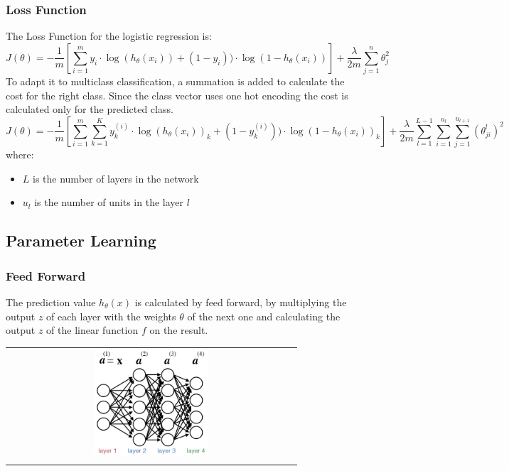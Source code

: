 \subsubsection{Loss Function}
The Loss Function for the logistic regression is:
\begin{equation} \tag{Loss Function}
    J(\theta) = -\frac{1}{m} \left[ \sum_{i=1}^m y_i \cdot \log(h_\theta(x_i)) + (1-y_i)) \cdot \log(1-h_\theta(x_i)) \right] + \frac{\lambda}{2m} \sum_{j=1}^n \theta_j^2
\end{equation}
To adapt it to multiclass classification, a summation is added to calculate the cost for the right class.  Since the class vector uses one hot encoding the cost is calculated only for the predicted class.
\begin{equation} \tag{Softmax}
    J(\theta) = -\frac{1}{m} \left[ \sum_{i=1}^m \sum_{k=1}^K y_k^{(i)} \cdot \log(h_\theta(x_i))_k + (1-y_k^{(i)})) \cdot \log(1-h_\theta(x_i))_k \right] + \frac{\lambda}{2m} \sum_{l=1}^{L-1} \sum_{i=1}^{u_l} \sum_{j=1}^{u_{l+1}} (\theta_{ji}^l)^2
\end{equation}
where:
\begin{itemize}
    \item $L$ is the number of layers in the network
    \item $u_l$ is the number of units in the layer $l$
\end{itemize}

\subsection{Parameter Learning}

\subsubsection{Feed Forward}
The prediction value $h_\theta(x)$ is calculated by feed forward, by multiplying the output $z$ of each layer with the weights $\theta$ of the next one and calculating the output $z$ of the linear function $f$ on the result.
\begin{center}
    \begin{tabular}{c}
        \\ \includegraphics[width=0.4\textwidth]{images/NeuralNetworks5.png} \\ \\
    \end{tabular}
\end{center}

